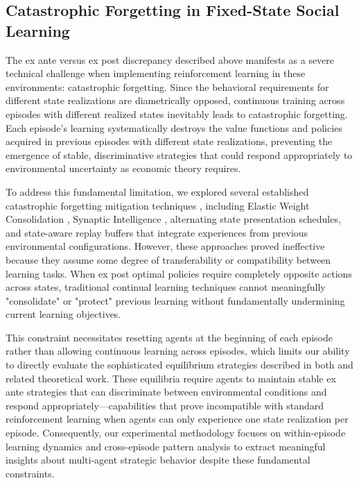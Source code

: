 \subsection{Catastrophic Forgetting in Fixed-State Social Learning}

The ex ante versus ex post discrepancy described above manifests as a severe technical challenge when implementing reinforcement learning in these environments: catastrophic forgetting. Since the behavioral requirements for different state realizations are diametrically opposed, continuous training across episodes with different realized states inevitably leads to catastrophic forgetting. Each episode's learning systematically destroys the value functions and policies acquired in previous episodes with different state realizations, preventing the emergence of stable, discriminative strategies that could respond appropriately to environmental uncertainty as economic theory requires.

To address this fundamental limitation, we explored several established catastrophic forgetting mitigation techniques \citep{vandeven2024continuallearningcatastrophicforgetting}, including Elastic Weight Consolidation \citep{kirkpatrick2017overcoming}, Synaptic Intelligence \citep{zenke2017continuallearningsynapticintelligence}, alternating state presentation schedules, and state-aware replay buffers that integrate experiences from previous environmental configurations. However, these approaches proved ineffective because they assume some degree of transferability or compatibility between learning tasks. When ex post optimal policies require completely opposite actions across states, traditional continual learning techniques cannot meaningfully "consolidate" or "protect" previous learning without fundamentally undermining current learning objectives.

This constraint necessitates resetting agents at the beginning of each episode rather than allowing continuous learning across episodes, which limits our ability to directly evaluate the sophisticated equilibrium strategies described in both \citet{keller2020undiscounted} and related theoretical work. These equilibria require agents to maintain stable ex ante strategies that can discriminate between environmental conditions and respond appropriately—capabilities that prove incompatible with standard reinforcement learning when agents can only experience one state realization per episode. Consequently, our experimental methodology focuses on within-episode learning dynamics and cross-episode pattern analysis to extract meaningful insights about multi-agent strategic behavior despite these fundamental constraints.

